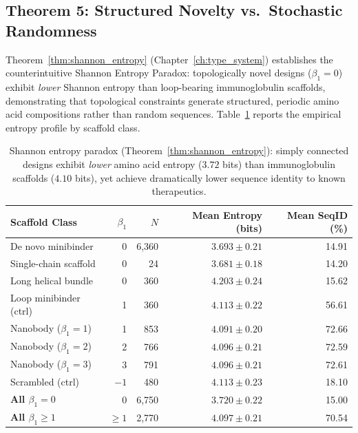 \subsection{Theorem 5: Structured Novelty vs.\ Stochastic Randomness}
\label{subsec:entropy_validation}

Theorem~\ref{thm:shannon_entropy} (Chapter~\ref{ch:type_system}) establishes
the counterintuitive Shannon Entropy Paradox: topologically novel designs
($\beta_1 = 0$) exhibit \emph{lower} Shannon entropy than loop-bearing
immunoglobulin scaffolds, demonstrating that topological constraints
generate structured, periodic amino acid compositions rather than random
sequences.  Table~\ref{tbl:entropy} reports the empirical entropy profile
by scaffold class.

\begin{table}[h!]
\centering
\small
\renewcommand{\arraystretch}{1.2}
\begin{tabular}{@{} l r r r r @{}}
\toprule
\textbf{Scaffold Class} & $\beta_1$ & $N$ & \textbf{Mean Entropy (bits)} & \textbf{Mean SeqID (\%)} \\
\midrule
De novo minibinder     & 0 & 6,360 & $3.693 \pm 0.21$ & 14.91 \\
Single-chain scaffold  & 0 & 24   & $3.681 \pm 0.18$ & 14.20 \\
Long helical bundle    & 0 & 360  & $4.203 \pm 0.24$ & 15.62 \\
Loop minibinder (ctrl) & 1 & 360  & $4.113 \pm 0.22$ & 56.61 \\
Nanobody ($\beta_1=1$) & 1 & 853  & $4.091 \pm 0.20$ & 72.66 \\
Nanobody ($\beta_1=2$) & 2 & 766  & $4.096 \pm 0.21$ & 72.59 \\
Nanobody ($\beta_1=3$) & 3 & 791  & $4.096 \pm 0.21$ & 72.61 \\
Scrambled (ctrl)       & $-1$ & 480 & $4.113 \pm 0.23$ & 18.10 \\
\midrule
\textbf{All $\beta_1=0$}  & 0 & 6,750 & $\mathbf{3.720} \pm 0.22$ & 15.00 \\
\textbf{All $\beta_1\ge1$}& $\ge 1$ & 2,770 & $\mathbf{4.097} \pm 0.21$ & 70.54 \\
\bottomrule
\end{tabular}
\caption{Shannon entropy paradox (Theorem~\ref{thm:shannon_entropy}):
         simply connected designs exhibit \emph{lower} amino acid entropy
         ($3.72$ bits) than immunoglobulin scaffolds ($4.10$ bits), yet
         achieve dramatically lower sequence identity to known therapeutics.}
\label{tbl:entropy}
\end{table}


